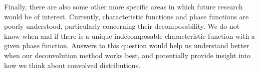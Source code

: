 Finally, there are also some other more specific areas in which future research would be of interest. Currently, characteristic functions and phase functions are poorly understood, particularly concerning their decomposability. 
We do not know when and if there is a unique indecomposable characteristic function with a given phase function. Answers to this question would help us understand better when our deconvolution method works best, and potentially provide insight into how we think about convolved distributions.



